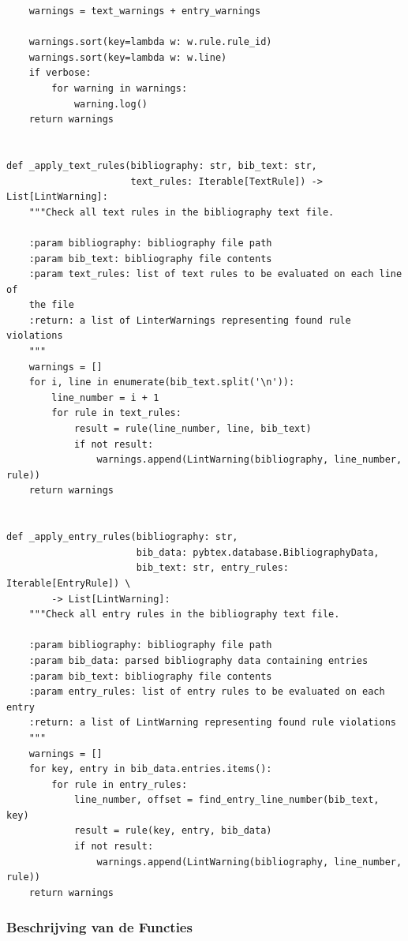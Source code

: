 \begin{verbatim}
    warnings = text_warnings + entry_warnings

    warnings.sort(key=lambda w: w.rule.rule_id)
    warnings.sort(key=lambda w: w.line)
    if verbose:
        for warning in warnings:
            warning.log()
    return warnings


def _apply_text_rules(bibliography: str, bib_text: str,
                      text_rules: Iterable[TextRule]) -> List[LintWarning]:
    """Check all text rules in the bibliography text file.

    :param bibliography: bibliography file path
    :param bib_text: bibliography file contents
    :param text_rules: list of text rules to be evaluated on each line of
    the file
    :return: a list of LinterWarnings representing found rule violations
    """
    warnings = []
    for i, line in enumerate(bib_text.split('\n')):
        line_number = i + 1
        for rule in text_rules:
            result = rule(line_number, line, bib_text)
            if not result:
                warnings.append(LintWarning(bibliography, line_number, rule))
    return warnings


def _apply_entry_rules(bibliography: str,
                       bib_data: pybtex.database.BibliographyData,
                       bib_text: str, entry_rules: Iterable[EntryRule]) \
        -> List[LintWarning]:
    """Check all entry rules in the bibliography text file.

    :param bibliography: bibliography file path
    :param bib_data: parsed bibliography data containing entries
    :param bib_text: bibliography file contents
    :param entry_rules: list of entry rules to be evaluated on each entry
    :return: a list of LintWarning representing found rule violations
    """
    warnings = []
    for key, entry in bib_data.entries.items():
        for rule in entry_rules:
            line_number, offset = find_entry_line_number(bib_text, key)
            result = rule(key, entry, bib_data)
            if not result:
                warnings.append(LintWarning(bibliography, line_number, rule))
    return warnings
\end{verbatim}

\subsubsection{Beschrijving van de Functies}

